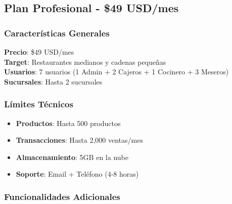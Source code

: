 \documentclass[12pt,a4paper]{article}
\begin{document}
\subsection{Plan Profesional - \$49 USD/mes}

\subsubsection{Características Generales}

\begin{tcolorbox}[colback=primaryblue!10, colframe=primaryblue, title=Plan Profesional]
    \textbf{Precio}: \$49 USD/mes\\
    \textbf{Target}: Restaurantes medianos y cadenas pequeñas\\
    \textbf{Usuarios}: 7 usuarios (1 Admin + 2 Cajeros + 1 Cocinero + 3 Meseros)\\
    \textbf{Sucursales}: Hasta 2 sucursales
\end{tcolorbox}

\subsubsection{Límites Técnicos}

\begin{itemize}
    \item \textbf{Productos}: Hasta 500 productos
    \item \textbf{Transacciones}: Hasta 2,000 ventas/mes
    \item \textbf{Almacenamiento}: 5GB en la nube
    \item \textbf{Soporte}: Email + Teléfono (4-8 horas)
\end{itemize}

\subsubsection{Funcionalidades Adicionales}
\end{document}
